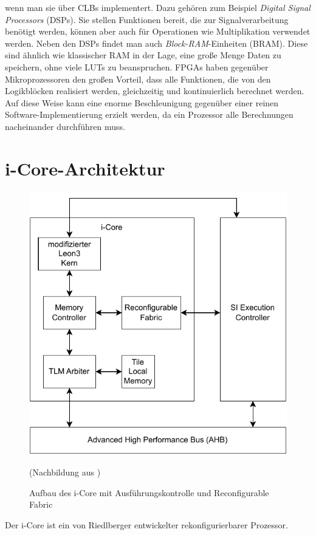 wenn man sie über CLBs implementert. Dazu gehören zum Beispiel \textit{Digital Signal Processors} (DSPs).
Sie stellen Funktionen bereit, die zur Signalverarbeitung benötigt werden, können aber auch für Operationen wie Multiplikation verwendet werden.
Neben den DSPs findet man auch \textit{Block-RAM}-Einheiten (BRAM). Diese sind ähnlich wie klassischer RAM in der Lage, eine große Menge Daten zu speichern,
ohne viele LUTs zu beanspruchen. FPGAs haben gegenüber Mikroprozessoren den großen Vorteil, dass alle Funktionen, die von den Logikblöcken
realisiert werden, gleichzeitig und kontinuierlich berechnet werden. Auf diese Weise kann eine enorme Beschleunigung gegenüber einer
reinen Software-Implementierung erzielt werden, da ein Prozessor alle Berechnungen nacheinander durchführen muss.

\section{i-Core-Architektur}
\begin{figure}
    \center
    \includegraphics{images/Icore_Arch.pdf}
    \caption{Aufbau des i-Core mit Ausführungskontrolle und Reconfigurable Fabric}
	(Nachbildung aus \cite{hering2020})
    \label{fig:icore_arch}
\end{figure}
\label{sec:icore_arch}
Der i-Core ist ein von Riedlberger \cite{riedlberger2013} entwickelter rekonfigurierbarer Prozessor.
